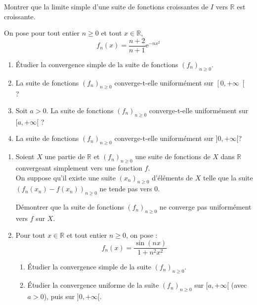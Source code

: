 \documentclass[a4paper,10pt]{report}
\begin{document}
\begin{Exa} Montrer que la limite simple d'une suite de fonctions croissantes de $I$ vers $\mathbb{R}$ est croissante.
\end{Exa}

\begin{Exa} On pose pour tout entier $n \geq 0$ et tout $x \in \mathbb{R}$,
$$f_{n}(x) =\dfrac{n+2}{n+1}\mathrm{e}^{-n x^{2}}$$
\begin{enumerate}
\item \'Etudier la convergence simple de la suite de fonctions $\left(f_{n}\right) _{n \geq 0}$.
\item La suite de fonctions  $\left(f_{n}\right) _{n \geq 0}$ converge-t-elle uniformément sur $\left[ 0,+\infty\right[$ ?
\item Soit $a>0$. La suite de fonctions $\left(f_{n}\right) _{n \geq 0}$ converge-t-elle uniform\'{e}ment sur  $[a,+\infty[$ ?	
\item La suite de fonctions  $\left(f_{n}\right) _{n \geq 0}$ converge-t-elle uniform\'{e}ment sur $]0,+\infty[$? 
\end{enumerate}
\end{Exa}

\begin{Exa} \begin{enumerate}
\item Soient $X$ une partie de $\mathbb{R}$ et $\left( f_{n}\right) _{n \geq 0}$ une suite de fonctions de $X$ dans $\mathbb{R}$ convergeant simplement vers une fonction $f$. \\
On suppose qu'il existe une suite $\left( x_{n}\right)_{n \geq 0}$ d'\'{e}l\'{e}ments de $X$ telle que la suite $\left( f_{n}(x_{n})-f\left( x_{n}\right) \right) _{n \geq 0}$ ne tende pas vers $0$. \medskip

D\'{e}montrer que la suite de fonctions $\left( f_{n}\right) _{n \geq 0}$ ne converge pas uniform\'{e}ment vers $f$ sur $X$.

\item Pour tout $x\in\mathbb{R}$ et tout entier $n \geq 0$, on pose :
$$f_{n}(x) =\dfrac{\sin \left( nx\right) }{1+n^{2}x^{2}}$$
	\begin{enumerate}
	\item \'Etudier la convergence simple de la suite $\left( f_{n}\right)_{n \geq 0}$.
	\item \'Etudier la convergence uniforme de la suite $\left( f_{n}\right)_{n \geq 0}$ sur $[a,+\infty[$ (avec $a>0$),  puis sur $]0,+\infty[$.
	\end{enumerate}
\end{enumerate}
\end{Exa}
\end{document}
